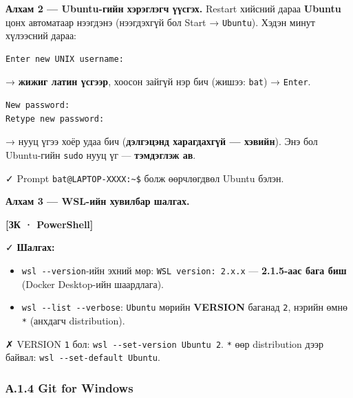\textbf{Алхам 2 --- Ubuntu-гийн хэрэглэгч үүсгэх.} Restart хийсний дараа \textbf{Ubuntu} цонх автоматаар нээгдэнэ (нээгдэхгүй бол Start → \texttt{Ubuntu}). Хэдэн минут хүлээсний дараа:

\begin{verbatim}
Enter new UNIX username:
\end{verbatim}

→ \textbf{жижиг латин үсгээр}, хоосон зайгүй нэр бич (жишээ: \texttt{bat}) → \texttt{Enter}.

\begin{verbatim}
New password:
Retype new password:
\end{verbatim}

→ нууц үгээ хоёр удаа бич (\textbf{дэлгэцэнд харагдахгүй --- хэвийн}). Энэ бол Ubuntu-гийн \texttt{sudo} нууц үг --- \textbf{тэмдэглэж ав}.

✓ Prompt \texttt{bat@LAPTOP-XXXX:\textasciitilde{}\$} болж өөрчлөгдвөл Ubuntu бэлэн.

\textbf{Алхам 3 --- WSL-ийн хувилбар шалгах.}

\textbf{{[}ЗК · PowerShell{]}}

\begin{Shaded}
\begin{Highlighting}[]
\end{Highlighting}
\end{Shaded}

✓ \textbf{Шалгах:}

\begin{itemize}
\tightlist
\item
  \texttt{wsl\ -\/-version}-ийн эхний мөр: \texttt{WSL\ version:\allowbreak{}\ 2.\allowbreak{}x.\allowbreak{}x} --- \textbf{2.1.5-аас бага биш} (Docker Desktop-ийн шаардлага).
\item
  \texttt{wsl\ -\/\allowbreak{}-list\ -\/\allowbreak{}-verbose}: \texttt{Ubuntu} мөрийн \textbf{VERSION} баганад \texttt{2}, нэрийн өмнө \texttt{*} (анхдагч distribution).
\end{itemize}

✗ VERSION \texttt{1} бол: \texttt{wsl\ -\/\allowbreak{}-set-version\ Ubuntu\ 2}. \texttt{*} өөр distribution дээр байвал: \texttt{wsl\ -\/\allowbreak{}-set-default\ Ubuntu}.

\hypertarget{ux430.1.4-git-for-windows}{%
\subsubsection{А.1.4 Git for Windows}\label{ux430.1.4-git-for-windows}}

